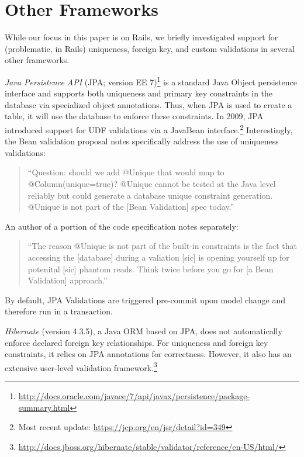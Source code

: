 
\section{Other Frameworks}
\label{sec:other-orms}

While our focus in this paper is on Rails, we briefly investigated
support for (problematic, in Rails) uniqueness, foreign key, and
custom validations in several other frameworks.

\newcommand{\orm}[1]{{\vspace{.45em}\noindent\textit{#1}}}

\orm{Java Persistence API}
(JPA; version EE 7)\footnote{\url{http://docs.oracle.com/javaee/7/api/javax/persistence/package-summary.html}}
is a standard Java Object persistence interface and supports both
uniqueness and primary key constraints in the database via specialized
object annotations. Thus, when JPA is used to create a table, it will
use the database to enforce these constraints. In 2009, JPA introduced
support for UDF validations via a JavaBean interface.\footnote{Most
  recent update: \url{https://jcp.org/en/jsr/detail?id=349}} Interestingly,
the Bean validation proposal notes specifically address the use of
uniqueness validations:
\begin{quote}
``Question: should we add @Unique that would map to @Column(unique=true)?
@Unique cannot be tested at the Java level reliably but could generate
a database unique constraint generation. @Unique is not part
of the [Bean Validation] spec today.''~\cite{jsr-bean}
\end{quote}
An author of a portion of the code specification notes separately:
\begin{quote}
  ``The reason @Unique is not part of the built-in constraints is the
  fact that accessing the [database] during a valiation [sic] is
  opening yourself up for potenital [sic] phantom reads. Think twice
  before you go for [a Bean Validation] approach.''~\cite{unique-bean}
\end{quote}
By default, JPA Validations are triggered pre-commit upon model
change and therefore run in a transaction.

\orm{Hibernate} (version 4.3.5), a Java ORM based on JPA, does
not automatically enforce declared foreign key relationships. For uniqueness and
foreign key constraints, it relies on JPA annotations for
correctness. However, it also has an extensive user-level validation
framework.\footnote{\url{http://docs.jboss.org/hibernate/stable/validator/reference/en-US/html/}}

